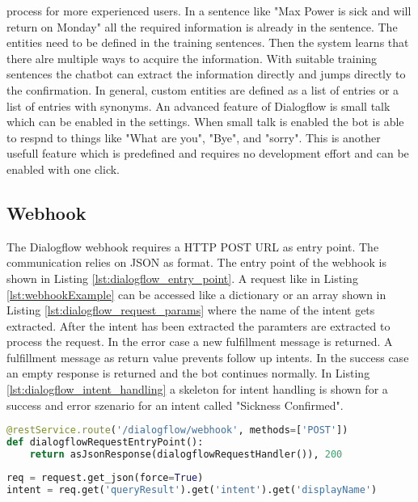 process for more experienced users.
In a sentence like "Max Power is sick and will return on Monday" all the required information is 
already in the sentence. 
The entities need to be defined in the training sentences.
Then the system learns that there alre multiple ways to acquire the information.
With suitable training sentences the chatbot can extract the information 
directly and jumps directly to the confirmation.  
In general, custom entities are defined as a list of entries or a list of entries with 
synonyms.
An advanced feature of Dialogflow is small talk which can be enabled in the settings.
When small talk is enabled the bot is able to respnd to things like "What are you",
"Bye", and "sorry".
This is another usefull feature which is predefined and requires no development effort
and can be enabled with one click. 

\subsection{Webhook}
The Dialogflow webhook requires a HTTP POST URL as entry point.
The communication relies on JSON as format.
The entry point of the webhook is shown in Listing \ref{lst:dialogflow_entry_point}.
A request like in Listing \ref{lst:webhookExample} can be accessed like a dictionary or 
an array shown in Listing \ref{lst:dialogflow_request_params} where the name of the 
intent gets extracted. 
After the intent has been extracted the paramters are extracted to process the request.
In the error case a new fulfillment message is returned.
A fulfillment message as return value prevents follow up intents.
In the success case an empty response is returned and the bot continues normally.
In Listing \ref{lst:dialogflow_intent_handling} a skeleton for intent handling
is shown for a success and error szenario for an intent called "Sickness Confirmed".

\begin{lstlisting}[caption={Dialogflow Webhook Entry Point}, label={lst:dialogflow_entry_point},captionpos=b,frame=single,language={Python},commentstyle=\color{mygreen},keywordstyle=\color{blue},
    morekeywords={}]                
@restService.route('/dialogflow/webhook', methods=['POST'])
def dialogflowRequestEntryPoint():
    return asJsonResponse(dialogflowRequestHandler()), 200
\end{lstlisting}  

\begin{lstlisting}[caption={Dialogflow Request Parameters}, label={lst:dialogflow_request_params},captionpos=b,frame=single,language={Python},commentstyle=\color{mygreen},keywordstyle=\color{blue},
    morekeywords={}]                
req = request.get_json(force=True)
intent = req.get('queryResult').get('intent').get('displayName')
\end{lstlisting}  

